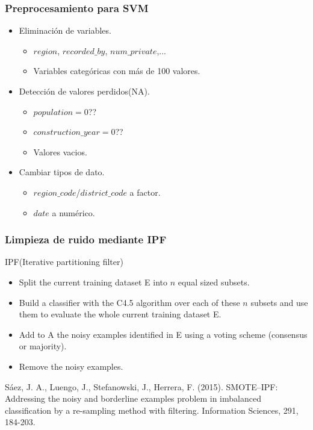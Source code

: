 \begin{frame}
\frametitle{Preprocesamiento para SVM}

\begin{itemize}
	\item Eliminación de variables. 
	\begin{itemize}
		\item $region$, $recorded\_by$, $num\_private$,...
		\item Variables categóricas con más de 100 valores.
	\end{itemize}
	\pause
	\item Detección de valores perdidos(NA).
	\begin{itemize}
		\item $population = 0$??
		\item $construction\_year = 0$??
		\item Valores vacios.
	\end{itemize}
	\pause
	\item Cambiar tipos de dato.
	\begin{itemize}
		\item $region\_code$/$district\_code$ a factor.
		\item $date$ a numérico.
	\end{itemize}
\end{itemize}



\end{frame}

\begin{frame}

\frametitle{Limpieza de ruido mediante IPF}

	
	\begin{exampleblock}{IPF(Iterative partitioning filter)}
	
		\begin{itemize}
			\item Split the current training dataset E into $n$ equal sized subsets.
			\item  Build a classifier with the C4.5 algorithm over each of these $n$ subsets and use them to evaluate the whole current training dataset E.
			\item Add to A the noisy examples identified in E using a voting scheme (consensus or majority).
			\item Remove the noisy examples.
			
		\end{itemize}
		Sáez, J. A., Luengo, J., Stefanowski, J.,  Herrera, F. (2015). SMOTE–IPF: Addressing the noisy and borderline examples problem in imbalanced classification by a re-sampling method with filtering. Information Sciences, 291, 184-203.
	\end{exampleblock}

	


\end{frame}

